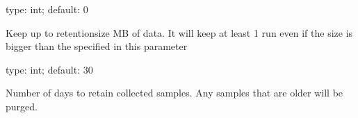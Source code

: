 \documentclass[letterpaper,10pt,english]{sphinxmanual}
\begin{document}
\begin{fulllineitems}
\label{\detokenize{mariadb-stat:cmdoption-mariadb-stat-retention-size}}
\sphinxAtStartPar
type: int; default: 0

\sphinxAtStartPar
Keep up to \textendash{}retention\sphinxhyphen{}size MB of data. It will keep at least 1 run even if the size is bigger
than the specified in this parameter

\end{fulllineitems}


\begin{fulllineitems}
\label{\detokenize{mariadb-stat:cmdoption-mariadb-stat-retention-time}}
\sphinxAtStartPar
type: int; default: 30

\sphinxAtStartPar
Number of days to retain collected samples.  Any samples that are older will be
purged.

\end{fulllineitems}

\end{document}
